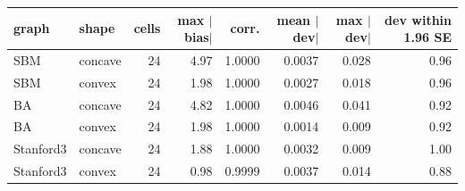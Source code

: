 \begin{tabular}{llrrrrrr}
\toprule
graph & shape & cells & max $|$bias$|$ & corr. & mean $|$dev$|$ & max $|$dev$|$ & dev within 1.96 SE \\
\midrule
SBM & concave & 24 & 4.97 & 1.0000 & 0.0037 & 0.028 & 0.96 \\
SBM & convex & 24 & 1.98 & 1.0000 & 0.0027 & 0.018 & 0.96 \\
BA & concave & 24 & 4.82 & 1.0000 & 0.0046 & 0.041 & 0.92 \\
BA & convex & 24 & 1.98 & 1.0000 & 0.0014 & 0.009 & 0.92 \\
Stanford3 & concave & 24 & 1.88 & 1.0000 & 0.0032 & 0.009 & 1.00 \\
Stanford3 & convex & 24 & 0.98 & 0.9999 & 0.0037 & 0.014 & 0.88 \\
\bottomrule
\end{tabular}
